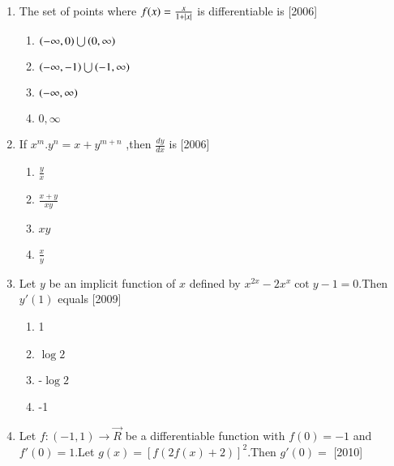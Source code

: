 \documentclass[journal,12pt,twocolumn]{IEEEtran}
\theoremstyle{remark}
\begin{document}
\begin{enumerate}
\begin{multicols}{4}
   
    \begin{enumerate}
    \item 24
    \item 36
    \item 12
    \item 18
    \end{enumerate}
     \end{multicols}
    \item The set of points where $f(x)=\frac{x}{1+\left\vert x\right\vert}$ is differentiable is \hfill[2006]\break
    \begin{multicols}{2}
    
    \begin{enumerate}
    \item $\left(-\infty,0\right)\bigcup\left(0,\infty\right)$
    \item $\left(-\infty,-1\right)\bigcup\left(-1,\infty\right)$
    \item $\left(-\infty,\infty\right)$
    \item ${0,\infty}$
    \end{enumerate}
    \end{multicols}
    \item If $x^m.y^n={x+y}^{m+n}$ ,then $\frac{dy}{dx}$ is \hfill[2006]\break
    \begin{multicols}{4}
        
  
    \begin{enumerate}
    \item $\frac{y}{x}$
    \item $\frac{x+y}{xy}$
    \item $xy$
    \item $\frac{x}{y}$
    \end{enumerate}
    \end{multicols}
    \item Let $y$ be an implicit function of $x$ defined by $x^{2x}-2x^x\cot{y}-1=0$.Then $y'(1)$ equals
    \hfill[2009]\break
    \begin{multicols}{4}
    \begin{enumerate}
    \item 1
    \item $\log2$
    \item -$\log2$
    \item -1
    \end{enumerate}
    \end{multicols}
    \item Let $f:(-1,1)\rightarrow\vec{R}$ be a differentiable function with $f(0)=-1$ and $f'(0)=1$.Let $g(x)=[f(2f(x)+2)]^2$.Then $g'(0)=$
	    \hfill[2010]
     \begin{multicols}{4}
         

\end{multicols}
\end{enumerate}
\end{document}
